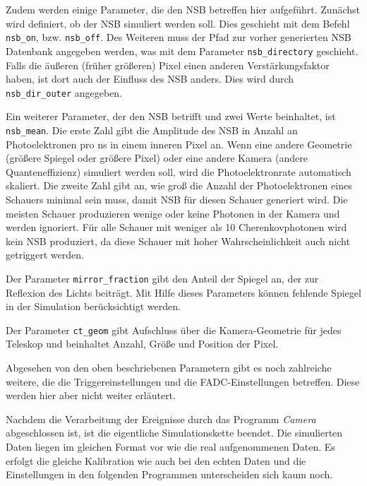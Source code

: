 Zudem werden einige Parameter, die den NSB betreffen hier aufgeführt.
Zunächst wird definiert, ob der NSB simuliert werden soll. 
Dies geschieht mit dem Befehl \texttt{nsb\_on}, bzw. \texttt{nsb\_off}.
Des Weiteren muss der Pfad zur vorher generierten NSB Datenbank angegeben werden, was mit dem Parameter \texttt{nsb\_directory} geschieht.
Falls die äußeren (früher größeren) Pixel einen anderen Verstärkungsfaktor haben, ist dort auch der Einfluss des NSB anders. 
Dies wird durch \texttt{nsb\_dir\_outer} angegeben.

Ein weiterer Parameter, der den NSB betrifft und zwei Werte beinhaltet, ist \texttt{nsb\_mean}.
Die erste Zahl gibt die Amplitude des NSB in Anzahl an Photoelektronen pro ns in einem inneren Pixel an.
Wenn eine andere Geometrie (größere Spiegel oder größere Pixel) oder eine andere Kamera (andere Quanteneffizienz) simuliert werden soll, wird die Photoelektronrate automatisch skaliert.
Die zweite Zahl gibt an, wie groß die Anzahl der Photoelektronen eines Schauers minimal sein muss, damit NSB für diesen Schauer generiert wird.
Die meisten Schauer produzieren wenige oder keine Photonen in der Kamera und werden ignoriert.
Für alle Schauer mit weniger als 10 Cherenkovphotonen wird kein NSB produziert, da diese Schauer mit hoher Wahrscheinlichkeit auch nicht getriggert werden.

Der Parameter \texttt{mirror\_fraction} gibt den Anteil der Spiegel an, der zur Reflexion des Lichts beiträgt. 
Mit Hilfe dieses Parameters können fehlende Spiegel in der Simulation berücksichtigt werden.

Der Parameter \texttt{ct\_geom} gibt Aufschluss über die Kamera-Geometrie für jedes Teleskop und beinhaltet Anzahl, Größe und Position der Pixel.

Abgesehen von den oben beschriebenen Parametern gibt es noch zahlreiche weitere, die die Triggereinstellungen und die FADC-Einstellungen betreffen.
Diese werden hier aber nicht weiter erläutert.

Nachdem die Verarbeitung der Ereignisse durch das Programm \textit{Camera} abgeschlossen ist, ist die eigentliche Simulationskette beendet.
Die simulierten Daten liegen im gleichen Format vor wie die real aufgenommenen Daten.
Es erfolgt die gleiche Kalibration wie auch bei den echten Daten und die Einstellungen in den folgenden Programmen unterscheiden sich kaum noch.

